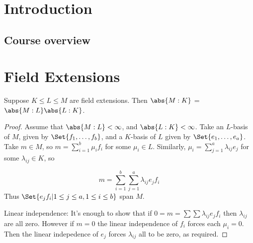 \documentclass{article}
\begin{document}
\maketitle


\clearpage
\section{Introduction}

\subsection{Course overview}












\clearpage
\section{Field Extensions}\label{sec:1}









\begin{nthm}\label{thm:towerLaw}
    Suppose $K \leq L \leq M$ are field extensions. Then $\abs{M:K}$ = $\abs{M:L}\abs{L:K}$.
\end{nthm}
\begin{proof}
    Assume that $\abs{M:L} < \infty$, and $\abs{L:K} < \infty$.
    Take an $L$-basis of $M$, given by $\Set{f_1, \dotsc, f_b}$, and a $K$-basis of $L$ given by $\Set{e_1, \dotsc, e_a}$.
    Take $m \in M$, so $m = \sum_{i=1}^b \mu_i f_i$ for some $\mu_i \in L$.
    Similarly, $\mu_i = \sum_{j=1}^a \lambda_{ij} e_j$ for some $\lambda_{ij} \in K$, so

    \begin{equation*}
        m = \sum_{i=1}^b \sum_{j=1}^a \lambda_{ij} e_j f_i
    \end{equation*}
    Thus $\Set{e_j f_i | 1 \leq j \leq a, 1 \leq i \leq b}$ span $M$.

    Linear independence:
    It's enough to show that if $0 = m = \sum \sum \lambda_{ij} e_j f_i$ then $\lambda_{ij}$ are all zero.
    However if $m = 0$ the linear independence of $f_i$ forces each $\mu_i = 0$.
    Then the linear indepedence of $e_j$ forces $\lambda_{ij}$ all to be zero, as required.
\end{proof}
\end{document}
